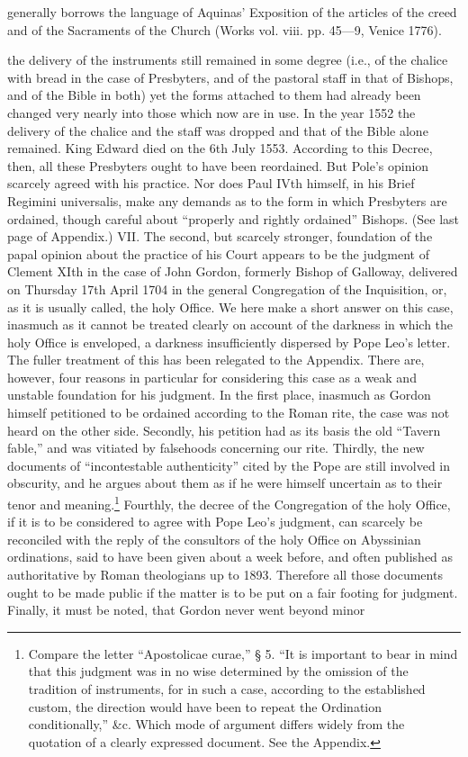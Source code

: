 generally borrows the language of Aquinas’ Exposition of the articles of the creed and of the Sacraments of the Church (Works vol. viii. pp. 45—9, Venice 1776).

the delivery of the instruments still remained in some degree (i.e., of the chalice with bread in the case of Presbyters, and of the pastoral staff in that of Bishops, and of the Bible in both) yet the forms attached to them had already been changed very nearly into those which now are in use. In the year 1552 the delivery of the chalice and the staff was dropped and that of the Bible alone remained. King Edward died on the 6th July 1553. According to this Decree, then, all these Presbyters ought to have been reordained. But Pole’s opinion scarcely agreed with his practice. Nor does Paul IVth himself, in his Brief Regimini universalis, make any demands as to the form in which Presbyters are ordained, though careful about “properly and rightly ordained” Bishops. (See last page of Appendix.) VII. The second, but scarcely stronger, foundation of the papal opinion about the practice of his Court appears to be the judgment of Clement XIth in the case of John Gordon, formerly Bishop of Galloway, delivered on Thursday 17th April 1704 in the general Congregation of the Inquisition, or, as it is usually called, the holy Office. We here make a short answer on this case, inasmuch as it cannot be treated clearly on account of the darkness in which the holy Office is enveloped, a darkness insufficiently dispersed by Pope Leo’s letter. The fuller treatment of this has been relegated to the Appendix. There are, however, four reasons in particular for considering this case as a weak and unstable foundation for his judgment. In the first place, inasmuch as Gordon himself petitioned to be ordained according to the Roman rite, the case was not heard on the other side. Secondly, his petition had as its basis the old “Tavern fable,” and was vitiated by falsehoods concerning our rite. Thirdly, the new documents of “incontestable authenticity” cited by the Pope are still involved in obscurity, and he argues about them as if he were himself uncertain as to their tenor and meaning.\footnote{Compare the letter “Apostolicae curae,” § 5. “It is important to bear in mind that this judgment was in no wise determined by the omission of the tradition of instruments, for in such a case, according to the established custom, the direction would have been to repeat the Ordination conditionally,” \&c. Which mode of argument differs widely from the quotation of a clearly expressed document. See the Appendix.} Fourthly, the decree of the Congregation of the holy Office, if it is to be considered to agree with Pope Leo’s judgment, can scarcely be reconciled with the reply of the consultors of the holy Office on Abyssinian ordinations, said to have been given about a week before, and often published as authoritative by Roman theologians up to 1893. Therefore all those documents ought to be made public if the matter is to be put on a fair footing for judgment. Finally, it must be noted, that Gordon never went beyond minor

